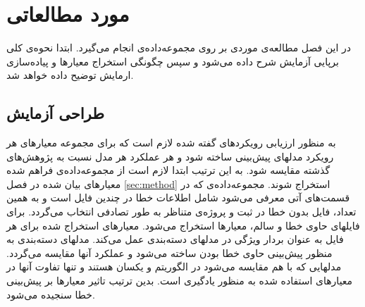 \chapter{مورد مطالعاتی}
\label{chap:case-study}
در این فصل مطالعه‌ی موردی بر روی مجموعه‌داده‌ی  \cite{Just:2014:DDE:2610384.2628055} انجام می‌گیرد. ابتدا نحوه‌ی کلی برپایی آزمایش شرح داده می‌شود و سپس چگونگی استخراج معیارها و پیاده‌سازی ارمایش توضیح داده خواهد شد. 
\section{طراحی آزمایش}
به منظور ارزیابی رویکردهای گفته شده لازم است که برای مجموعه معیارهای هر رویکرد مدلهای پیش‌بینی ساخته شود و هر عملکرد هر مدل نسبت به پژوهش‌های گذشته مقایسه شود. به این ترتیب ابتدا لازم است از مجموعه‌داده‌ی فراهم شده معیارهای بیان شده در فصل \ref{sec:method} استخراج شوند. مجموعه‌داده‌ی  که در قسمت‌های آتی معرفی می‌شود شامل اطلاعات خطا در چندین فایل است و به همین تعداد، فایل بدون خطا در ثبت و پروژه‌ی متناظر به طور تصادفی انتخاب می‌گردد. برای فایلهای حاوی خطا و سالم، معیارها استخراج می‌شود. معیارهای استخراج شده  برای هر فایل به عنوان بردار ویژگی در مدلهای دسته‌بندی عمل می‌کند. مدلهای دسته‌بندی به منظور پیش‌بینی حاوی خطا بودن ساخته می‌شود و عملکرد آنها مقایسه می‌گردد. مدلهایی که با هم مقایسه می‌شود در الگوریتم و  یکسان هستند و تنها تفاوت آنها در معیارهای استفاده شده به منظور یادگیری است. بدین ترتیب تاثیر معیارها بر پیش‌بینی خطا سنجیده می‌شود. 




